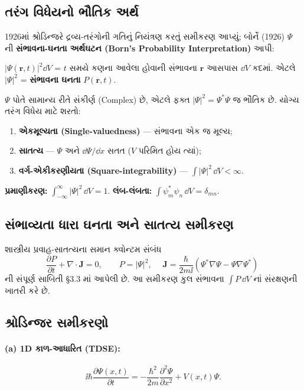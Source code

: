\subsection{તરંગ વિધેયનો ભૌતિક અર્થ }
1926માં શ્રોડિન્જરે દ્રવ્ય-તરંગોની ગતિનું નિયંત્રણ કરતું સમીકરણ આપ્યું; બોર્ને (1926) $\Psi$ ની \textbf{સંભાવના-ઘનતા અર્થઘટન (Born's Probability Interpretation)} આપી:
\begin{vayakhya}
$|\Psi(\mathbf{r},t)|^{2}\dd V$ = $t$ સમયે કણના આવેલા હોવાની સંભાવના $\mathbf{r}$ આસપાસ $\dd V$ કદમાં. એટલે $|\Psi|^{2}$ = \textbf{સંભાવના ઘનતા} $P(\mathbf{r},t)$.
\end{vayakhya}
$\Psi$ પોતે સામાન્ય રીતે સંકીર્ણ (Complex) છે, એટલે ફક્ત $|\Psi|^2=\Psi^*\Psi$ જ ભૌતિક છે. યોગ્ય તરંગ વિધેય માટે શરતો:
\begin{enumerate}[label=(\alph*)]
  \item \textbf{એકમૂલ્યતા (Single-valuedness)} — સંભાવના એક જ મૂલ્ય;
  \item \textbf{સાતત્ય} — $\Psi$ અને $\dd\Psi/\dd x$ સતત ($V$ પરિમિત હોય ત્યાં);
  \item \textbf{વર્ગ-એકીકરણીયતા (Square-integrability)} — $\int|\Psi|^{2}\,\dd V<\infty$.
\end{enumerate}
\textbf{પ્રમાણીકરણ:} $\displaystyle\int_{-\infty}^{\infty}|\Psi|^{2}\,\dd V=1$.
\textbf{લંબ-લંબતા:} $\displaystyle\int\psi_m^*\psi_n\,\dd V=\delta_{mn}$.

\subsection{સંભાવ્યતા ધારા ઘનતા અને સાતત્ય સમીકરણ}
શાસ્ત્રીય પ્રવાહ-સાતત્યના સમાન ક્વોન્ટમ સંબંધ
\[
\frac{\partial P}{\partial t}+\nabla\cdot\mathbf{J}=0,
\qquad
P=|\Psi|^{2},\quad
\boxed{\;\mathbf{J}=\frac{\hbar}{2m\ii}\left(\Psi^{*}\nabla\Psi-\Psi\nabla\Psi^{*}\right)\;}
\]
ની સંપૂર્ણ સાબિતી \S3.3 માં આપેલી છે. આ સમીકરણ કુલ સંભાવના $\int P\,\dd V$ નાં સંરક્ષણની ખાતરી કરે છે.

\subsection{શ્રોડિન્જર સમીકરણો }

\paragraph{(a) 1D કાળ-આધારિત (TDSE):}
\begin{equation}
\ii\hbar\frac{\partial\Psi(x,t)}{\partial t}
=-\frac{\hbar^{2}}{2m}\frac{\partial^{2}\Psi}{\partial x^{2}}+V(x,t)\Psi .
\label{eq:tdse1d}
\end{equation}

